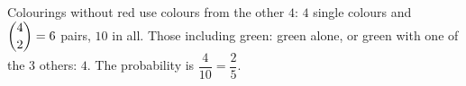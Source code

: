 Colourings without red use colours from the other $4$: $4$ single colours and $\dbinom42=6$ pairs, $10$ in all. Those including green: green alone, or green with one of the $3$ others: $4$. The probability is $\dfrac{4}{10}=\boxed{\dfrac{2}{5}}$.
